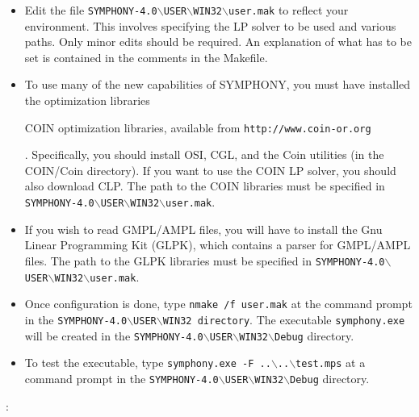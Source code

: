 \begin{itemize}

\item Edit the file
\texttt{SYMPHONY-4.0$\backslash$USER$\backslash$WIN32$\backslash$user.mak} to
reflect your environment. This involves specifying the LP solver to be used
and various paths. Only minor edits should be required. An explanation of what
has to be set is contained in the comments in the Makefile.

\item To use many of the new capabilities of SYMPHONY, you must have installed
the \emph{} optimization
libraries 
\begin{latexonly} 
COIN optimization libraries, available from
\texttt{http://www.coin-or.org} 
\end{latexonly}. Specifically, you should
install OSI, CGL, and the Coin utilities (in the COIN/Coin directory). If you
want to use the COIN LP solver, you should also download CLP. The path to the
COIN libraries must be specified in
\texttt{SYMPHONY-4.0$\backslash$USER$\backslash$WIN32$\backslash$user.mak}.

\item If you wish to read GMPL/AMPL files, you will have to install the Gnu
Linear Programming Kit (GLPK), which contains a parser for GMPL/AMPL
files. The path to the GLPK libraries must be specified in
\texttt{SYMPHONY-4.0$\backslash$USER$\backslash$WIN32$\backslash$user.mak}.

\item Once configuration is done, type \texttt{nmake /f user.mak} at the
command prompt in the
\texttt{SYMPHONY-4.0$\backslash$USER$\backslash$WIN32 directory}. The
executable \texttt{symphony.exe} will be created in the
\texttt{SYMPHONY-4.0$\backslash$USER$\backslash$WIN32$\backslash$Debug}  
directory.

\item To test the executable, type \texttt{symphony.exe -F ..$\backslash$..$\backslash$test.mps} at a command 
prompt in the
\texttt{SYMPHONY-4.0$\backslash$USER$\backslash$WIN32$\backslash$Debug} 
directory.

\end{itemize}

:

